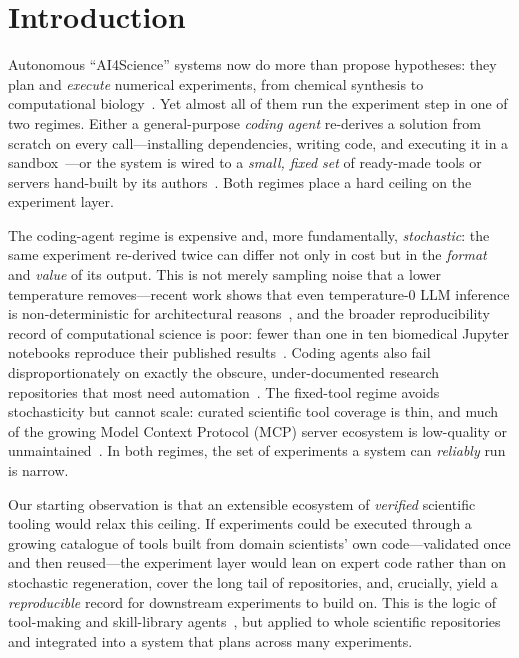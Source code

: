 \section{Introduction}

Autonomous ``AI4Science'' systems now do more than propose hypotheses: they
plan and \emph{execute} numerical experiments, from chemical synthesis to
computational biology~\citep{boiko2023coscientist,bran2024chemcrow,google2025coscientist,swanson2025virtuallab}.
Yet almost all of them run the experiment step in one of two regimes. Either a
general-purpose \emph{coding agent} re-derives a solution from scratch on every
call---installing dependencies, writing code, and executing it in a
sandbox~\citep{lu2024aiscientist,schmidgall2025agentlab}---or the system is
wired to a \emph{small, fixed set} of ready-made tools or servers hand-built by
its authors~\citep{boiko2023coscientist,bran2024chemcrow}. Both regimes place a
hard ceiling on the experiment layer.

The coding-agent regime is expensive and, more fundamentally, \emph{stochastic}:
the same experiment re-derived twice can differ not only in cost but in the
\emph{format} and \emph{value} of its output. This is not merely sampling noise
that a lower temperature removes---recent work shows that even temperature-0 LLM
inference is non-deterministic for architectural
reasons~\citep{he2025nondeterminism}, and the broader reproducibility record of
computational science is poor: fewer than one in ten biomedical Jupyter notebooks
reproduce their published results~\citep{pimentel2024notebooks}. Coding agents
also fail disproportionately on exactly the obscure, under-documented research
repositories that most need automation~\citep{super2024,corebench2024,starace2025paperbench}.
The fixed-tool regime avoids stochasticity but cannot scale: curated scientific
tool coverage is thin, and much of the growing Model Context Protocol (MCP)
server ecosystem is low-quality or unmaintained~\citep{hou2025mcpsurvey,mcpquality2025}.
In both regimes, the set of experiments a system can \emph{reliably} run is
narrow.

Our starting observation is that an extensible ecosystem of \emph{verified}
scientific tooling would relax this ceiling. If experiments could be executed
through a growing catalogue of tools built from domain scientists' own
code---validated once and then reused---the experiment layer would lean on
expert code rather than on stochastic regeneration, cover the long tail of
repositories, and, crucially, yield a \emph{reproducible} record for downstream
experiments to build on. This is the logic of tool-making and skill-library
agents~\citep{cai2024latm,yuan2024craft,wang2023voyager}, but applied to whole
scientific repositories and integrated into a system that plans across many
experiments.


